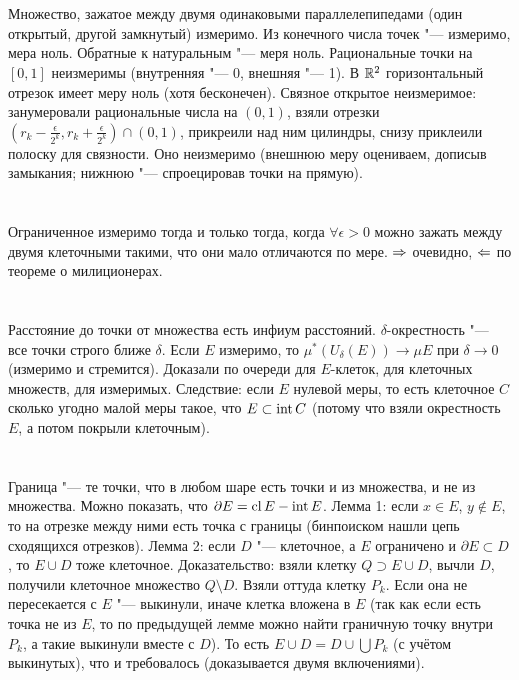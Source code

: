 \section{} %
Множество, зажатое между двумя одинаковыми параллелепипедами (один открытый, другой замкнутый) измеримо.
Из конечного числа точек "--- измеримо, мера ноль.
Обратные к натуральным "--- меря ноль.
Рациональные точки на $[0,1]$ неизмеримы (внутренняя "--- 0, внешняя "--- 1).
В $\mathbb{R}^2$ горизонтальный отрезок имеет меру ноль (хотя бесконечен).
Связное открытое неизмеримое: занумеровали рациональные числа на $(0,1)$, взяли отрезки $(r_k - \frac{\epsilon}{2^k}, r_k + \frac{\epsilon}{2^k})\cap(0,1)$,
прикреили над ним цилиндры, снизу приклеили полоску для связности.
Оно неизмеримо (внешнюю меру оцениваем, дописыв замыкания; нижнюю "--- спроецировав точки на прямую).

\section{} %
Ограниченное измеримо тогда и только тогда, когда $\forall \epsilon > 0$ можно зажать между двумя клеточными такими, что они мало отличаются по мере.
$\Rightarrow$ очевидно, $\Leftarrow$ по теореме о милиционерах.

\section{} %
Расстояние до точки от множества есть инфиум расстояний.
$\delta$-окрестность "--- все точки строго ближе $\delta$.
Если $E$ измеримо, то $\mu^*(U_\delta(E)) \to \mu E$ при $\delta \to 0$ (измеримо и стремится).
Доказали по очереди для $E$-клеток, для клеточных множеств, для измеримых.
Следствие: если $E$ нулевой меры, то есть клеточное $C$ сколько угодно малой меры такое, что $E \subset \operatorname{int} C$ (потому что взяли окрестность $E$, а потом покрыли клеточным).

\section{} %
Граница "--- те точки, что в любом шаре есть точки и из множества, и не из множества.
Можно показать, что $\partial E = \operatorname{cl} E - \operatorname{int} E$.
Лемма 1: если $x \in E$, $y \notin E$, то на отрезке между ними есть точка с границы (бинпоиском нашли цепь сходящихся отрезков).
Лемма 2: если $D$ "--- клеточное, а $E$ ограничено и $\partial E \subset D$, то $E \cup D$ тоже клеточное.
Доказательство: взяли клетку $Q \supset E \cup D$, вычли $D$, получили клеточное множество $Q \setminus D$.
Взяли оттуда клетку $P_k$. Если она не пересекается с $E$ "--- выкинули, иначе клетка вложена в $E$ (так как если есть точка не из $E$, то по предыдущей лемме можно найти граничную точку внутри $P_k$, а такие выкинули вместе с $D$).
То есть $E \cup D = D \cup \bigcup P_k$ (с учётом выкинутых), что и требовалось (доказывается двумя включениями).

